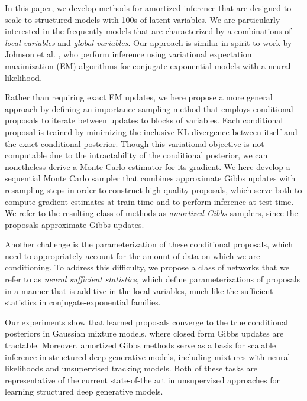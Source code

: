 \documentclass[anonymous=false, %
               format=acmsmall, %
               review=true, %
               screen=true, %
               nonacm=true]{acmart}
\theoremstyle{definition}
\begin{document}
In this paper, we develop methods for amortized inference that are designed to scale to structured models with 100s of latent variables. We are particularly interested in the frequently models that are characterized by a combinations of \emph{local variables} and \emph{global variables}. Our approach is similar in spirit to work by Johnson et al. \cite{johnson2016composing}, who perform inference using variational expectation maximization (EM) algorithms \cite{beal2003variational,bishop2006pattern,wainwright2008graphical} for conjugate-exponential models with a neural likelihood. 

Rather than requiring exact EM updates, we here propose a more general approach by defining an importance sampling method that employs conditional proposals to iterate between updates to blocks of variables. Each conditional proposal is trained by minimizing the inclusive KL divergence between itself and the exact conditional posterior. Though this variational objective is not computable due to the intractability of the conditional posterior, we can nonetheless derive a Monte Carlo estimator for its gradient. We here develop a sequential Monte Carlo sampler \cite{delmoral2006sequential} that combines approximate Gibbs updates with resampling steps in order to construct high quality proposals, which serve both to compute gradient estimates at train time and to perform inference at test time. We refer to the resulting class of methods as \emph{amortized Gibbs} samplers, since the proposals approximate Gibbs updates. 

Another challenge is the parameterization of these conditional proposals, which need to appropriately account for the amount of data on which we are conditioning. To address this difficulty, we propose a class of networks that we refer to as \emph{neural sufficient statistics}, which define parameterizations of proposals in a manner that is additive in the local variables, much like the sufficient statistics in conjugate-exponential families.

Our experiments show that learned proposals converge to the true conditional posteriors in Gaussian mixture models, where closed form Gibbs updates are tractable. Moreover, amortized Gibbs methods serve as a basis for scalable inference in structured deep generative models, including mixtures with neural likelihoods and unsupervised tracking models. Both of these tasks are representative of the current state-of-the art in unsupervised approaches for learning structured deep generative models.
\end{document}
